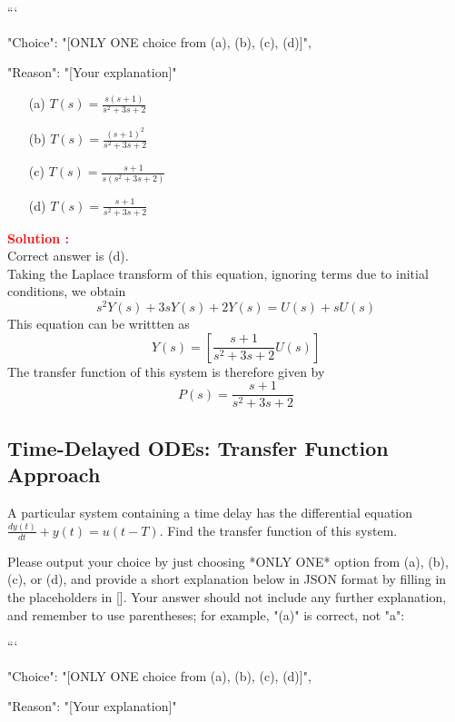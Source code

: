 \documentclass[12pt]{article}
\begin{document}
```
{

"Choice": "[ONLY ONE choice from (a), (b), (c), (d)]",

"Reason": "[Your explanation]"

}

\begin{itemize}
    \item[(a)] \(T(s) = \frac{s(s+1)}{s^2+3s+2}\)
    \item[(b)] \(T(s) = \frac{(s+1)^2}{s^2+3s+2}\)
    \item[(c)] \(T(s) = \frac{s+1}{s(s^2+3s+2)}\)
    \item[(d)] \(T(s) = \frac{s+1}{s^2+3s+2}\)
\end{itemize}
\textbf{\textcolor{red}{Solution :}} \\
Correct answer is (d).\\
Taking the Laplace transform of this equation, ignoring terms due to initial conditions, we obtain
\begin{equation}
    s^2 Y(s) + 3sY(s) + 2Y(s) = U(s) + s U(s)
\end{equation}
This equation can be writtten as 
\begin{equation}
    Y(s) = \left[ \frac{s+1}{s^2+3s+2} U(s) \right]
\end{equation}
The transfer function of this system is therefore given by
\begin{equation}
    P(s) = \frac{s+1}{s^2+3s+2}
\end{equation}

\clearpage
\subsection{Time-Delayed ODEs: Transfer Function Approach}

A particular system containing a time delay has the differential equation \(\frac{dy(t)}{dt} + y(t) = u(t-T)\). Find the transfer function of this system.

Please output your choice by just choosing *ONLY ONE* option from (a), (b), (c), or (d), and provide a short explanation below in JSON format by filling in the placeholders in []. Your answer should not include any further explanation, and remember to use parentheses; for example, "(a)" is correct, not "a":

```
{

"Choice": "[ONLY ONE choice from (a), (b), (c), (d)]",

"Reason": "[Your explanation]"

}
\end{document}
